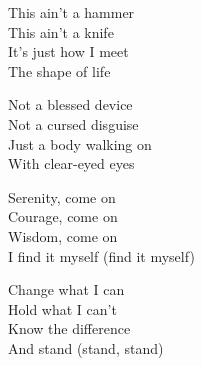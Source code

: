 \begin{lyrics}
This ain't a hammer\\
This ain't a knife\\
It's just how I meet\\
The shape of life

Not a blessed device\\
Not a cursed disguise\\
Just a body walking on\\
With clear-eyed eyes

Serenity, come on\\
Courage, come on\\
Wisdom, come on\\
I find it myself (find it myself)

Change what I can\\
Hold what I can't\\
Know the difference\\
And stand (stand, stand)
\end{lyrics}

